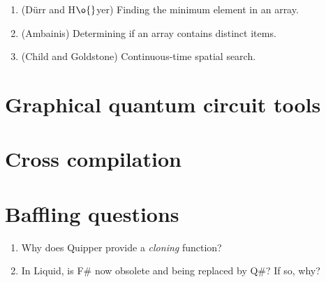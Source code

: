 \documentclass[12pt]{book}
\begin{document}
\begin{enumerate}
\item (D\"{u}rr and H$\o{}$yer) Finding the minimum element in an array.

\item (Ambainis) Determining if an array contains distinct items.

\item (Child and Goldstone) Continuous-time spatial search.

\end{enumerate}



\chapter{Graphical quantum circuit tools}




\chapter{Cross compilation}



\chapter{Baffling questions}

\begin{enumerate}
\item Why does Quipper provide a {\em cloning} function?

\item In Liquid, is F\# now obsolete and being replaced by Q\#? If so, why?
\end{enumerate}





\end{document}
